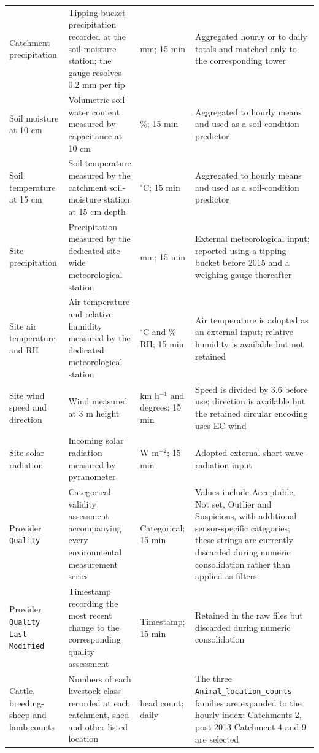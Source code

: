 {\begin{longtable}{p{3.2cm}p{4.2cm}p{2.5cm}p{4.6cm}}
Catchment precipitation & Tipping-bucket precipitation recorded at the soil-moisture station; the gauge resolves 0.2 mm per tip & mm; 15 min & Aggregated hourly or to daily totals and matched only to the corresponding tower \\
Soil moisture at 10 cm & Volumetric soil-water content measured by capacitance at 10 cm & \%; 15 min & Aggregated to hourly means and used as a soil-condition predictor \\
Soil temperature at 15 cm & Soil temperature measured by the catchment soil-moisture station at 15 cm depth & $^{\circ}$C; 15 min & Aggregated to hourly means and used as a soil-condition predictor \\
Site precipitation & Precipitation measured by the dedicated site-wide meteorological station & mm; 15 min & External meteorological input; reported using a tipping bucket before 2015 and a weighing gauge thereafter \\
Site air temperature and RH & Air temperature and relative humidity measured by the dedicated meteorological station & $^{\circ}$C and \% RH; 15 min & Air temperature is adopted as an external input; relative humidity is available but not retained \\
Site wind speed and direction & Wind measured at 3 m height & km h$^{-1}$ and degrees; 15 min & Speed is divided by 3.6 before use; direction is available but the retained circular encoding uses EC wind \\
Site solar radiation & Incoming solar radiation measured by pyranometer & W m$^{-2}$; 15 min & Adopted external short-wave-radiation input \\
Provider \texttt{Quality} & Categorical validity assessment accompanying every environmental measurement series & Categorical; 15 min & Values include Acceptable, Not set, Outlier and Suspicious, with additional sensor-specific categories; these strings are currently discarded during numeric consolidation rather than applied as filters \\
Provider \texttt{Quality Last Modified} & Timestamp recording the most recent change to the corresponding quality assessment & Timestamp; 15 min & Retained in the raw files but discarded during numeric consolidation \\
Cattle, breeding-sheep and lamb counts & Numbers of each livestock class recorded at each catchment, shed and other listed location & head count; daily & The three \texttt{Animal\_location\_counts} families are expanded to the hourly index; Catchments 2, post-2013 Catchment 4 and 9 are selected \\

\end{longtable}}
